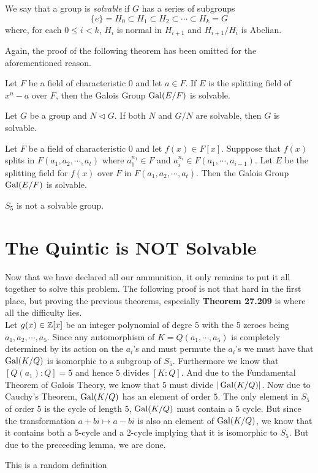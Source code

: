 \begin{definition}
	We say that a group is \textit{solvable} if $G$ has a series of subgroups 
	\begin{equation*}
		\{e\} = H_0\subset H_1\subset H_2\subset\cdots\subset H_k=G
	\end{equation*}
	where, for each $0\le i < k$, $H_i$ is normal in $H_{i+1}$ and $H_{i+1}/H_{i}$ is Abelian.
\end{definition}

Again, the proof of the following theorem has been omitted for the aforementioned reason.
\begin{proposition}
	Let $F$ be a field of characteristic $0$ and let $a\in F$. If $E$ is the splitting field of $x^n-a$ over $F$, then the Galois Group $\operatorname{Gal}(E/F)$ is solvable.
\end{proposition}

\begin{proposition}
	Let $G$ be a group and $N\vartriangleleft G$. If both $N$ and $G/N$ are solvable, then $G$ is solvable.
\end{proposition}

\begin{theorem}[Galois]
	Let $F$ be a field of characteristic $0$ and let $f(x)\in F[x]$. Supppose that $f(x)$ splits in $F(a_1,a_2,\cdots,a_t)$ where $a_1^{n_1}\in F$ and $a_i^{n_i}\in F(a_1,\cdots,a_{i-1})$. Let $E$ be the splitting field for $f(x)$ over $F$ in $F(a_1,a_2,\cdots,a_t)$. Then the Galois Group $\operatorname{Gal}(E/F)$ is solvable.
\end{theorem}

\begin{lemma}
	$S_5$ is not a solvable group.
\end{lemma}

\section*{The Quintic is NOT Solvable}
Now that we have declared all our ammunition, it only remains to put it all together to solve this problem. The following proof is not that hard in the first place, but proving the previous theorems, especially \textbf{Theorem 27.209} is where all the difficulty lies.\\
Let $g(x)\in\mathbb{Z}[x]$ be an integer polynomial of degre $5$ with the 5 zeroes being $a_1,a_2,\cdots,a_5$. Since any automorphism of $K = Q(a_1,\cdots,a_5)$ is completely determined by its action on the $a_i$'s and must permute the $a_i$'s we must have that $\operatorname{Gal}(K/Q)$ is isomorphic to a subgroup of $S_5$. Furthermore we know that $[Q(a_1):Q] = 5$ and hence $5$ divides $[K:Q]$. And due to the Fundamental Theorem of Galois Theory, we know that 5 must divide $|\operatorname{Gal}(K/Q)|$. Now due to Cauchy's Theorem, $\operatorname{Gal}(K/Q)$ has an element of order $5$. The only element in $S_5$ of order $5$ is the cycle of length $5$, $\operatorname{Gal}(K/Q)$ must contain a $5$ cycle. But since the transformation $a+bi\mapsto a-bi$ is also an element of $\operatorname{Gal}(K/Q)$, we know that it contains both a 5-cycle and a 2-cycle implying that it is isomorphic to $S_5$. But due to the preceeding lemma, we are done.

\begin{definition}
	This is a random definition
\end{definition}